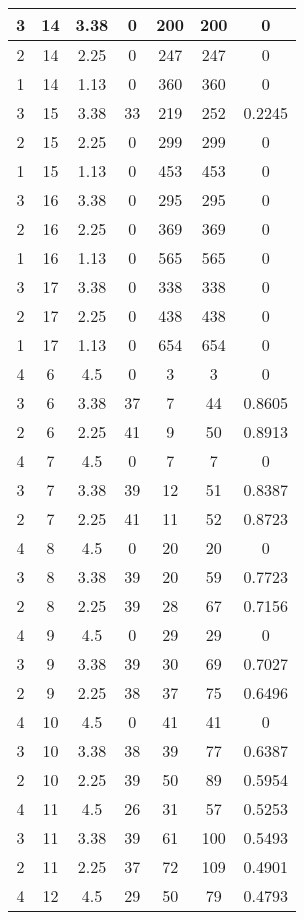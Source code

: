 \documentclass[letterpaper, 12pt]{article}
\begin{document}
\begin{longtable}{|c|c|c|c|c|c|c|}
\hline
3 & 14 & 3.38 & 0 & 200 & 200 & 0 \\
\hline
2 & 14 & 2.25 & 0 & 247 & 247 & 0 \\
\hline
1 & 14 & 1.13 & 0 & 360 & 360 & 0 \\
\hline
3 & 15 & 3.38 & 33 & 219 & 252 & 0.2245 \\
\hline
2 & 15 & 2.25 & 0 & 299 & 299 & 0 \\
\hline
1 & 15 & 1.13 & 0 & 453 & 453 & 0 \\
\hline
3 & 16 & 3.38 & 0 & 295 & 295 & 0 \\
\hline
2 & 16 & 2.25 & 0 & 369 & 369 & 0 \\
\hline
1 & 16 & 1.13 & 0 & 565 & 565 & 0 \\
\hline
3 & 17 & 3.38 & 0 & 338 & 338 & 0 \\
\hline
2 & 17 & 2.25 & 0 & 438 & 438 & 0 \\
\hline
1 & 17 & 1.13 & 0 & 654 & 654 & 0 \\
\hline
4 & 6 & 4.5 & 0 & 3 & 3 & 0 \\
\hline
3 & 6 & 3.38 & 37 & 7 & 44 & 0.8605 \\
\hline
2 & 6 & 2.25 & 41 & 9 & 50 & 0.8913 \\
\hline
4 & 7 & 4.5 & 0 & 7 & 7 & 0 \\
\hline
3 & 7 & 3.38 & 39 & 12 & 51 & 0.8387 \\
\hline
2 & 7 & 2.25 & 41 & 11 & 52 & 0.8723 \\
\hline
4 & 8 & 4.5 & 0 & 20 & 20 & 0 \\
\hline
3 & 8 & 3.38 & 39 & 20 & 59 & 0.7723 \\
\hline
2 & 8 & 2.25 & 39 & 28 & 67 & 0.7156 \\
\hline
4 & 9 & 4.5 & 0 & 29 & 29 & 0 \\
\hline
3 & 9 & 3.38 & 39 & 30 & 69 & 0.7027 \\
\hline
2 & 9 & 2.25 & 38 & 37 & 75 & 0.6496 \\
\hline
4 & 10 & 4.5 & 0 & 41 & 41 & 0 \\
\hline
3 & 10 & 3.38 & 38 & 39 & 77 & 0.6387 \\
\hline
2 & 10 & 2.25 & 39 & 50 & 89 & 0.5954 \\
\hline
4 & 11 & 4.5 & 26 & 31 & 57 & 0.5253 \\
\hline
3 & 11 & 3.38 & 39 & 61 & 100 & 0.5493 \\
\hline
2 & 11 & 2.25 & 37 & 72 & 109 & 0.4901 \\
\hline
4 & 12 & 4.5 & 29 & 50 & 79 & 0.4793 \\

\end{longtable}
\end{document}
